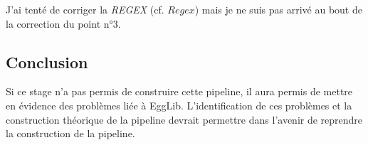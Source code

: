 \documentclass[../main]{subfiles} %
\begin{document}
J'ai tenté de corriger la \textit{REGEX} (cf. \cite{florent_f-marchalm1bioinfointernship2024-inrae_agap_ge2pop_2024} $Regex$) mais je ne suis pas arrivé au bout de la correction du point n°3. 


\subsection{Conclusion}
\label{sec:EggConclusion}
Si ce stage n'a pas permis de construire cette pipeline, il aura permis de mettre en évidence des problèmes liée à \gls{EggLib}. L'identification de ces problèmes et la construction théorique de la pipeline devrait permettre dans l'avenir de reprendre la construction de la pipeline.
\end{document}
